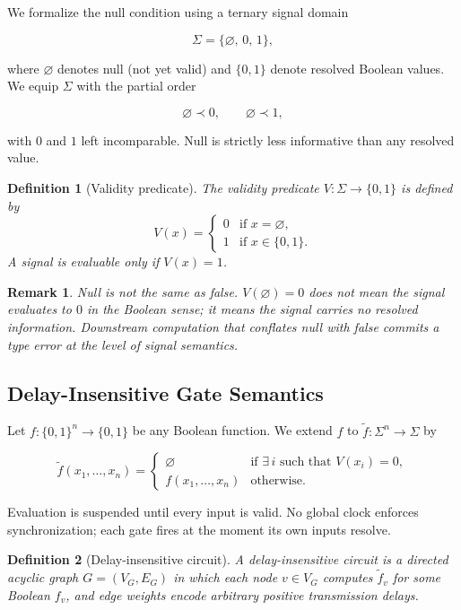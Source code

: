 \documentclass[11pt]{article}
\newtheorem{definition}{Definition}
\newtheorem{remark}{Remark}
\theoremstyle{remark}
\begin{document}
We formalize the null condition using a ternary signal domain

\[
\Sigma = \{\varnothing,\, 0,\, 1\},
\]

where $\varnothing$ denotes null (not yet valid) and $\{0,1\}$ denote resolved Boolean values. We equip $\Sigma$ with the partial order

\[
\varnothing \prec 0, \qquad \varnothing \prec 1,
\]

with $0$ and $1$ left incomparable. Null is strictly less informative than any resolved value.

\begin{definition}[Validity predicate]
The validity predicate $V : \Sigma \to \{0,1\}$ is defined by
\[
V(x) = \begin{cases} 0 & \text{if } x = \varnothing, \\ 1 & \text{if } x \in \{0,1\}. \end{cases}
\]
A signal is evaluable only if $V(x) = 1$.
\end{definition}

\begin{remark}
Null is not the same as false. $V(\varnothing) = 0$ does not mean the signal evaluates to $0$ in the Boolean sense; it means the signal carries no resolved information. Downstream computation that conflates null with false commits a type error at the level of signal semantics.
\end{remark}

\subsection{Delay-Insensitive Gate Semantics}

Let $f : \{0,1\}^n \to \{0,1\}$ be any Boolean function. We extend $f$ to $\tilde{f} : \Sigma^n \to \Sigma$ by

\[
\tilde{f}(x_1, \dots, x_n) = \begin{cases} \varnothing & \text{if } \exists\, i \text{ such that } V(x_i) = 0, \\ f(x_1, \dots, x_n) & \text{otherwise.} \end{cases}
\]

Evaluation is suspended until every input is valid. No global clock enforces synchronization; each gate fires at the moment its own inputs resolve.

\begin{definition}[Delay-insensitive circuit]
A delay-insensitive circuit is a directed acyclic graph $G = (V_G, E_G)$ in which each node $v \in V_G$ computes $\tilde{f}_v$ for some Boolean $f_v$, and edge weights encode arbitrary positive transmission delays.
\end{definition}
\end{document}

